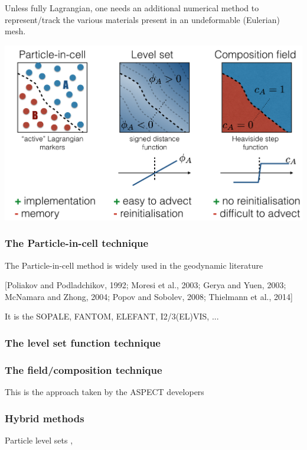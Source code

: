 
Unless fully Lagrangian, one needs an additional numerical method to represent/track
the various materials present in an undeformable (Eulerian) mesh.


\begin{center}
\includegraphics[width=15cm]{images/tracking}
\end{center}

\subsubsection{The Particle-in-cell technique}

\cite{galh18}

The Particle-in-cell method is widely used in the geodynamic literature \cite[e.g.][]{popo92}

 [Poliakov and Podladchikov, 1992; Moresi et al., 2003; Gerya and Yuen, 2003; McNamara and
Zhong, 2004; Popov and Sobolev, 2008; Thielmann et al., 2014]

It is the SOPALE, FANTOM, ELEFANT, I2/3(EL)VIS, ...

\subsubsection{The level set function technique}


\subsubsection{The field/composition technique}

This is the approach taken by the ASPECT developers \cite{krhb12,hedg17}


\subsubsection{Hybrid methods}

Particle level sets \cite{brtf08}, \cite{saev10}



